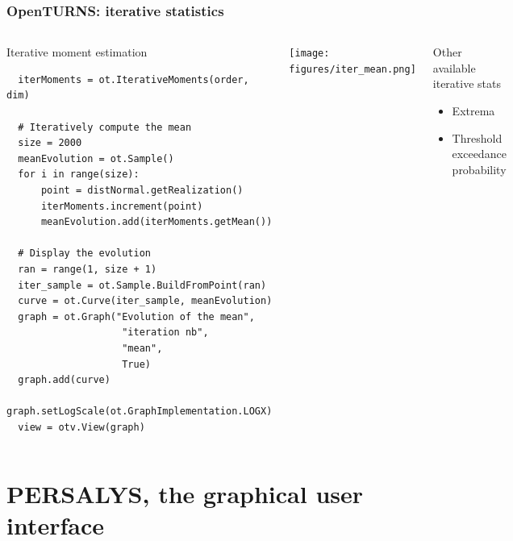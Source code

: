 \documentclass{beamer}
\begin{document}
\begin{frame}[containsverbatim]
  \frametitle{OpenTURNS: iterative statistics   }
\small
\begin{columns}



  \begin{block}{Iterative moment estimation}
  \begin{lstlisting}
  iterMoments = ot.IterativeMoments(order, dim)

  # Iteratively compute the mean
  size = 2000
  meanEvolution = ot.Sample()
  for i in range(size):
      point = distNormal.getRealization()
      iterMoments.increment(point)
      meanEvolution.add(iterMoments.getMean())

  # Display the evolution
  ran = range(1, size + 1)
  iter_sample = ot.Sample.BuildFromPoint(ran)
  curve = ot.Curve(iter_sample, meanEvolution)
  graph = ot.Graph("Evolution of the mean",
                    "iteration nb",
                    "mean",
                    True)
  graph.add(curve)
  graph.setLogScale(ot.GraphImplementation.LOGX)
  view = otv.View(graph)
  \end{lstlisting}
  \end{block}


  \texttt{[image: figures/iter\_mean.png]}

  \begin{block}{Other available iterative stats}
    \begin{itemize}
      \item Extrema
      \item Threshold exceedance probability
    \end{itemize}
  \end{block}

\end{columns}

\end{frame}


\section{PERSALYS, the graphical user interface}
\end{document}
